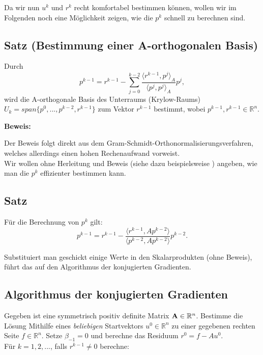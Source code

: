 Da wir nun $u^{k}$ und $r^{k}$ recht komfortabel bestimmen können, wollen wir im Folgenden noch eine Möglichkeit zeigen, wie die $p^{k}$ schnell zu berechnen sind.

\subsection{Satz (Bestimmung einer A-orthogonalen Basis)}
Durch
\begin{equation}
p^{k-1} = r^{k-1} - \sum_{j=0}^{k-2} \frac {\langle r^{k-1}, p^{j} \rangle _{A}} {\langle p^{j}, p^{j} \rangle _{A}} p^{j},
\end{equation}
wird die A-orthogonale Basis des Unterraums (Krylow-Raums) $U_{k} = span\{p^{0}, ..., p^{k-2},r^{k-1}\}$ zum Vektor $r^{k-1}$ bestimmt, wobei $p^{k-1},r^{k-1} \in \mathbb{R}^{n}$.

\textbf{Beweis:}

Der Beweis folgt direkt aus dem Gram-Schmidt-Orthonormalisierungsverfahren, welches allerdings einen hohen Rechenaufwand vorweist.\\
Wir wollen ohne Herleitung und Beweis (siehe dazu beispielsweise \cite{DR9}) angeben, wie man die $p^{k}$ effizienter bestimmen kann.

\subsection{Satz}
Für die Berechnung von $p^{k}$ gilt:
\begin{equation}
p^{k-1} = r^{k-1} - \frac {\langle r^{k-1}, Ap^{k-2} \rangle} {\langle p^{k-2}, Ap^{k-2} \rangle} p^{k-2}.
\end{equation}

Substituiert man geschickt einige Werte in den Skalarprodukten (ohne Beweis), führt das auf den Algorithmus der konjugierten Gradienten.

\subsection{Algorithmus der konjugierten Gradienten}\label{ss.Numerisches CG}

Gegeben ist eine symmetrisch positiv definite Matrix ${\textbf{A}} \in \mathbb{R}^{n}$. Bestimme die Lösung Mithilfe eines \textit{beliebigen} Startvektors $u^{0} \in \mathbb{R}^{n}$ zu einer gegebenen rechten Seite $f \in \mathbb{R}^{n}$. Setze $\beta_{-1} = 0$ und berechne das Residuum $r^{0} = f - Au^{0}$. \\
Für $k = 1,2,...$, falls $r^{k-1} \ne 0$ berechne:

